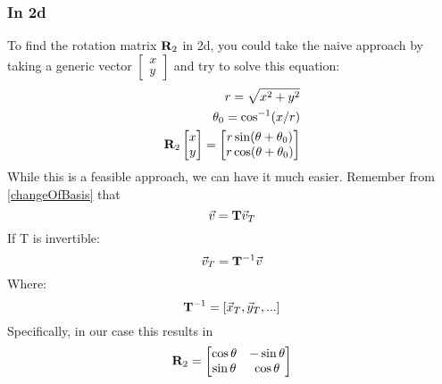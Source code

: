 \subsubsection{In 2d}
To find the rotation matrix $\mathbf{R}_2$  in 2d, you could take the naive approach by taking a generic vector $\begin{bmatrix}x \\ y\end{bmatrix}$ and try to solve this equation: 
\begin{align}
    r = \sqrt{x^2 + y^2} \\
    \theta_0 = \cos^{-1}(x/r) \\
    \mathbf{R}_2 \begin{bmatrix}x \\ y\end{bmatrix} = \begin{bmatrix} 
        r \sin(\theta + \theta_0) \\
        r \cos(\theta + \theta_0)
    \end{bmatrix}
\end{align}
While this is a feasible approach, we can have it much easier. Remember from \ref{changeOfBasis} that 
$$ \vec{v} = \mathbf{T} \vec{v}_T $$
If T is invertible:
$$ \vec{v}_T = \mathbf{T}^{-1} \vec{v} $$
Where:
$$ \mathbf{T}^{-1} = [\vec{x}_T, \vec{y}_T, ...] $$
Specifically, in our case this results in 
$$ \mathbf{R}_2 = \begin{bmatrix} 
    \cos{\theta} & -\sin{\theta} \\
    \sin{\theta} & \cos{\theta}
\end{bmatrix} $$

